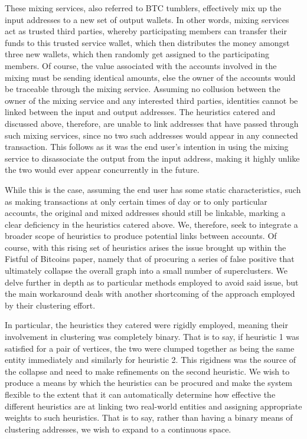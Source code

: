 \documentclass{article}
\begin{document}
These mixing services, also referred to BTC tumblers, effectively mix up the input addresses to a new set of output wallets. In other words, mixing services act as trusted third parties, whereby participating members can transfer their funds to this trusted service wallet, which then distributes the money amongst three new wallets, which then randomly get assigned to the participating members. Of course, the value associated with the accounts involved in the mixing must be sending identical amounts, else the owner of the accounts would be traceable through the mixing service. Assuming no collusion between the owner of the mixing service and any interested third parties, identities cannot be linked between the input and output addresses. The heuristics catered and discussed above, therefore, are unable to link addresses that have passed through such mixing services, since no two such addresses would appear in any connected transaction. This follows as it was the end user's intention in using the mixing service to disassociate the output from the input address, making it highly unlike the two would ever appear concurrently in the future.

While this is the case, assuming the end user has some static characteristics, such as making transactions at only certain times of day or to only particular accounts, the original and mixed addresses should still be linkable, marking a clear deficiency in the heuristics catered above. We, therefore, seek to integrate a broader scope of heuristics to produce potential links between accounts. Of course, with this rising set of heuristics arises the issue brought up within the Fistful of Bitcoins paper, namely that of procuring a series of false positive that ultimately collapse the overall graph into a small number of superclusters. We delve further in depth as to particular methods employed to avoid said issue, but the main workaround deals with another shortcoming of the approach employed by their clustering effort.

In particular, the heuristics they catered were rigidly employed, meaning their involvement in clustering was completely binary. That is to say, if heuristic 1 was satisfied for a pair of vertices, the two were clumped together as being the same entity immediately and similarly for heuristic 2. This rigidness was the source of the collapse and need to make refinements on the second heuristic. We wish to produce a means by which the heuristics can be procured and make the system flexible to the extent that it can automatically determine how effective the different heuristics are at linking two real-world entities and assigning appropriate weights to such heuristics. That is to say, rather than having a binary means of clustering addresses, we wish to expand to a continuous space. 
\end{document}
